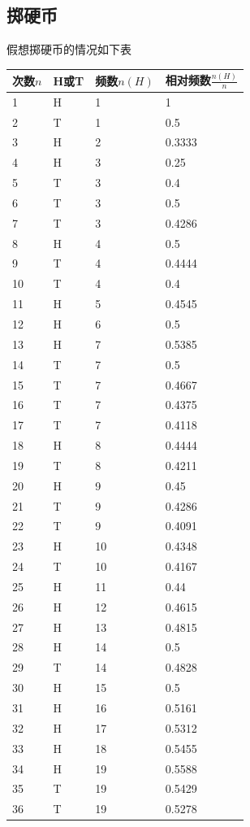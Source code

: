 \documentclass{article}
\begin{document}
\begin{CJK}{UTF8}{gbsn}
\section{掷硬币}
假想掷硬币的情况如下表
\\
\begin{tabular}{l|l|l|l}
	次数$n$ & H或T & 频数$n(H)$ & 相对频数$\frac{n(H)}{n}$\\
	\hline
	1 & H & 1 & 1\\
	2 & T & 1 & 0.5\\
	3 & H & 2 & 0.3333\\
	4 & H & 3 & 0.25\\
	5 & T & 3 & 0.4\\
	6 & T & 3 & 0.5\\
	7 & T & 3 & 0.4286\\
	8 & H & 4 & 0.5\\
	9 & T & 4 & 0.4444\\
	10 & T & 4 & 0.4\\
	11 & H & 5 & 0.4545\\
	12 & H & 6 & 0.5\\
	13 & H & 7 & 0.5385\\
	14 & T & 7 & 0.5\\
	15 & T & 7 & 0.4667\\
	16 & T & 7 & 0.4375\\
	17 & T & 7 & 0.4118\\
	18 & H & 8 & 0.4444\\
	19 & T & 8 & 0.4211\\
	20 & H & 9 & 0.45\\
	21 & T & 9 & 0.4286\\
	22 & T & 9 & 0.4091\\
	23 & H & 10 & 0.4348\\
	24 & T & 10 & 0.4167\\
	25 & H & 11 & 0.44\\
	26 & H & 12 & 0.4615\\
	27 & H & 13 & 0.4815\\
	28 & H & 14 & 0.5\\
	29 & T & 14 & 0.4828\\
	30 & H & 15 & 0.5\\
	31 & H & 16 & 0.5161\\
	32 & H & 17 & 0.5312\\
	33 & H & 18 & 0.5455\\
	34 & H & 19 & 0.5588\\
	35 & T & 19 & 0.5429\\
	36 & T & 19 & 0.5278\\

\end{tabular}
\end{CJK}
\end{document}
